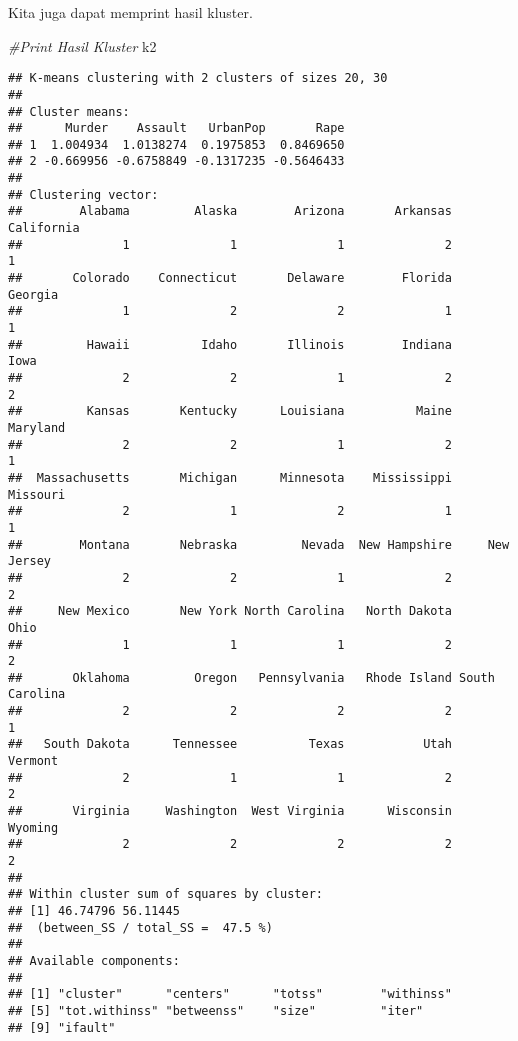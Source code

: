 \documentclass[]{article}
\newenvironment{Shaded}{\begin{snugshade}}{\end{snugshade}}
\newcommand{\CommentTok}[1]{\textcolor[rgb]{0.56,0.35,0.01}{\textit{#1}}}
\newcommand{\NormalTok}[1]{#1}
\begin{document}
Kita juga dapat memprint hasil kluster.

\begin{Shaded}
\begin{Highlighting}[]
\CommentTok{#Print Hasil Kluster}
\NormalTok{k2}
\end{Highlighting}
\end{Shaded}

\begin{verbatim}
## K-means clustering with 2 clusters of sizes 20, 30
## 
## Cluster means:
##      Murder    Assault   UrbanPop       Rape
## 1  1.004934  1.0138274  0.1975853  0.8469650
## 2 -0.669956 -0.6758849 -0.1317235 -0.5646433
## 
## Clustering vector:
##        Alabama         Alaska        Arizona       Arkansas     California 
##              1              1              1              2              1 
##       Colorado    Connecticut       Delaware        Florida        Georgia 
##              1              2              2              1              1 
##         Hawaii          Idaho       Illinois        Indiana           Iowa 
##              2              2              1              2              2 
##         Kansas       Kentucky      Louisiana          Maine       Maryland 
##              2              2              1              2              1 
##  Massachusetts       Michigan      Minnesota    Mississippi       Missouri 
##              2              1              2              1              1 
##        Montana       Nebraska         Nevada  New Hampshire     New Jersey 
##              2              2              1              2              2 
##     New Mexico       New York North Carolina   North Dakota           Ohio 
##              1              1              1              2              2 
##       Oklahoma         Oregon   Pennsylvania   Rhode Island South Carolina 
##              2              2              2              2              1 
##   South Dakota      Tennessee          Texas           Utah        Vermont 
##              2              1              1              2              2 
##       Virginia     Washington  West Virginia      Wisconsin        Wyoming 
##              2              2              2              2              2 
## 
## Within cluster sum of squares by cluster:
## [1] 46.74796 56.11445
##  (between_SS / total_SS =  47.5 %)
## 
## Available components:
## 
## [1] "cluster"      "centers"      "totss"        "withinss"    
## [5] "tot.withinss" "betweenss"    "size"         "iter"        
## [9] "ifault"
\end{verbatim}
\end{document}
